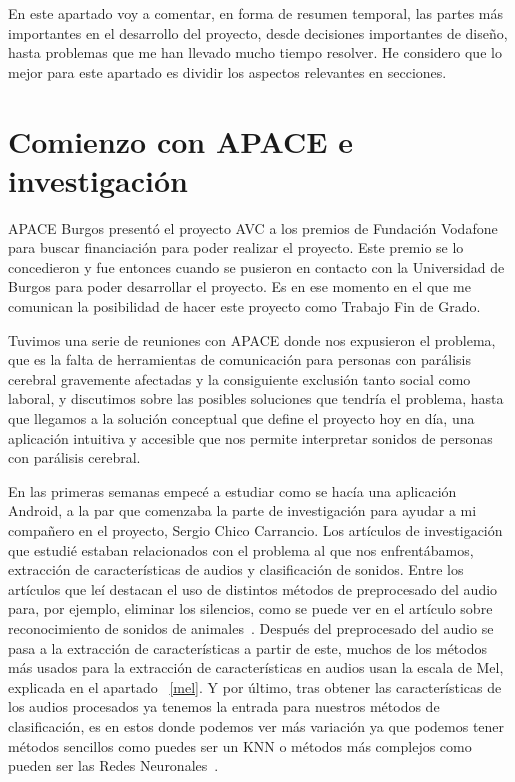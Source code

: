 
En este apartado voy a comentar, en forma de resumen temporal, las partes más importantes en el desarrollo del proyecto, desde decisiones importantes de diseño, hasta problemas que me han llevado mucho tiempo resolver. He considero que lo mejor para este apartado es dividir los aspectos relevantes en secciones.

\section{Comienzo con APACE e investigación}
APACE Burgos presentó el proyecto AVC a los premios de Fundación Vodafone para buscar financiación para poder realizar el proyecto. Este premio se lo concedieron y fue entonces cuando se pusieron en contacto con la Universidad de Burgos para poder desarrollar el proyecto. Es en ese momento en el que me comunican la posibilidad de hacer este proyecto como Trabajo Fin de Grado.

Tuvimos una serie de reuniones con APACE donde nos expusieron el problema, que es la falta de herramientas de comunicación para personas con parálisis cerebral gravemente afectadas y la consiguiente exclusión tanto social como laboral, y discutimos sobre las posibles soluciones que tendría el problema, hasta que llegamos a la solución conceptual que define el proyecto hoy en día, una aplicación intuitiva y accesible que nos permite interpretar sonidos de personas con parálisis cerebral.

En las primeras semanas empecé a estudiar como se hacía una aplicación Android, a la par que comenzaba la parte de investigación para ayudar a mi compañero en el proyecto, Sergio Chico Carrancio. Los artículos de investigación que estudié estaban relacionados con el problema al que nos enfrentábamos, extracción de características de audios y clasificación de sonidos. Entre los artículos que leí destacan el uso de distintos métodos de preprocesado del audio para, por ejemplo, eliminar los silencios, como se puede ver en el artículo sobre reconocimiento de sonidos de animales~\cite{yeo2011animal}. Después del preprocesado del audio se pasa a la extracción de características a partir de este, muchos de los métodos más usados para la extracción de características en audios usan la escala de Mel, explicada en el apartado ~\ref{mel}. Y por último, tras obtener las características de los audios procesados ya tenemos la entrada para nuestros métodos de clasificación, es en estos donde podemos ver más variación ya que podemos tener métodos sencillos como puedes ser un KNN o métodos más complejos como pueden ser las Redes Neuronales~\cite{pandeya2018domestic}.

